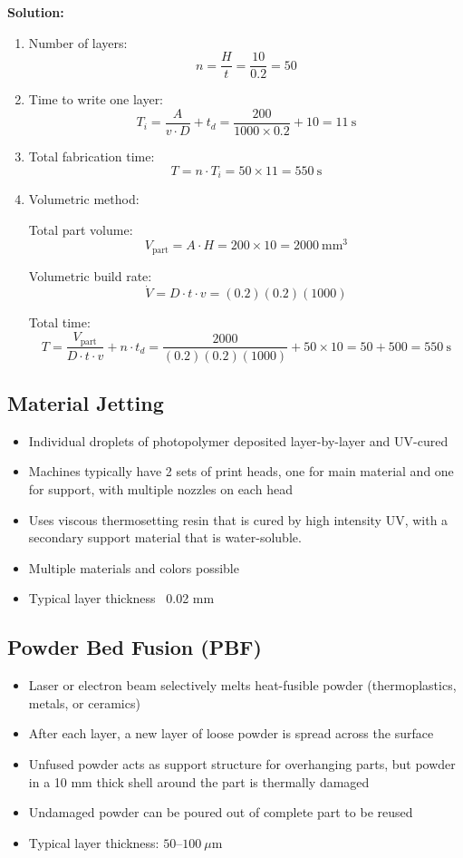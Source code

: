 \documentclass{article}
\begin{document}
\textbf{Solution:}

\begin{enumerate}
    \item Number of layers:
\[
n = \frac{H}{t} = \frac{10}{0.2} = 50
\]
    \item Time to write one layer:
\[
T_i = \frac{A}{v \cdot D} + t_d
= \frac{200}{1000 \times 0.2} + 10
= 11 \ \text{s}
\]
    \item Total fabrication time:
\[
T = n \cdot T_i = 50 \times 11 = \boxed{550 \ \text{s}}
\]
    \item Volumetric method:

Total part volume:
\[
V_{\text{part}} = A \cdot H = 200 \times 10 = 2000 \ \text{mm}^3
\]

Volumetric build rate:
\[
\dot{V} = D \cdot t \cdot v = (0.2)(0.2)(1000)
\]

Total time:
\[
T = \frac{V_{\text{part}}}{D \cdot t \cdot v} + n \cdot t_d
= \frac{2000}{(0.2)(0.2)(1000)} + 50 \times 10
= 50 + 500
= \boxed{550 \ \text{s}}
\]
\end{enumerate}

\subsection{Material Jetting}

\begin{itemize}
    \item Individual droplets of photopolymer deposited layer-by-layer and UV-cured
    \item Machines typically have 2 sets of print heads, one for main material and one for support, with multiple nozzles on each head
    \item Uses viscous thermosetting resin that is cured by high intensity UV, with a secondary support material that is water-soluble.
    \item Multiple materials and colors possible
    \item Typical layer thickness ~0.02 mm
\end{itemize}

\subsection{Powder Bed Fusion (PBF)}

\begin{itemize}
    \item Laser or electron beam selectively melts heat-fusible powder (thermoplastics, metals, or ceramics)
    \item After each layer, a new layer of loose powder is spread across the surface
    \item Unfused powder acts as support structure for overhanging parts, but powder in a 10 mm thick shell around the part is thermally damaged
    \item Undamaged powder can be poured out of complete part to be reused
    \item Typical layer thickness: $50$–$100\ \mu$m
\end{itemize}
\end{document}
